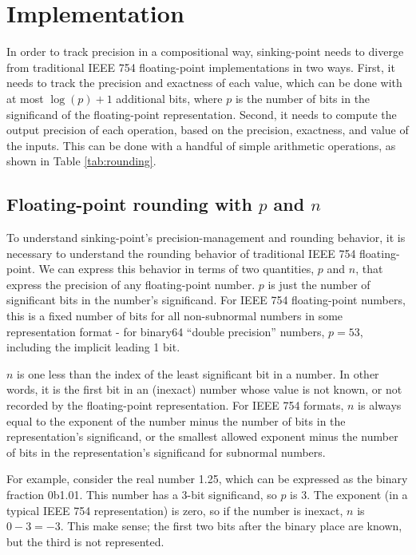 \documentclass[letterpaper,10pt]{article}
\begin{document}
\section{Implementation}

In order to track precision in a compositional way, sinking-point needs to diverge from traditional IEEE 754 floating-point implementations in two ways. First, it needs to track the precision and exactness of each value, which can be done with at most $\log(p) + 1$ additional bits, where $p$ is the number of bits in the significand of the floating-point representation. Second, it needs to compute the output precision of each operation, based on the precision, exactness, and value of the inputs. This can be done with a handful of simple arithmetic operations, as shown in Table \ref{tab:rounding}.

\subsection{Floating-point rounding with $p$ and $n$}

To understand sinking-point's precision-management and rounding behavior, it is necessary to understand the rounding behavior of traditional IEEE 754 floating-point. We can express this behavior in terms of two quantities, $p$ and $n$, that express the precision of any floating-point number. $p$ is just the number of significant bits in the number's significand. For IEEE 754 floating-point numbers, this is a fixed number of bits for all non-subnormal numbers in some representation format - for binary64 ``double precision'' numbers, $p = 53$, including the implicit leading 1 bit.

$n$ is one less than the index of the least significant bit in a number. In other words, it is the first bit in an (inexact) number whose value is not known, or not recorded by the floating-point representation. For IEEE 754 formats, $n$ is always equal to the exponent of the number minus the number of bits in the representation's significand, or the smallest allowed exponent minus the number of bits in the representation's significand for subnormal numbers.

For example, consider the real number 1.25, which can be expressed as the binary fraction 0b1.01. This number has a 3-bit significand, so $p$ is 3. The exponent (in a typical IEEE 754 representation) is zero, so if the number is inexact, $n$ is $0 - 3 = -3$. This make sense; the first two bits after the binary place are known, but the third is not represented.
\end{document}
